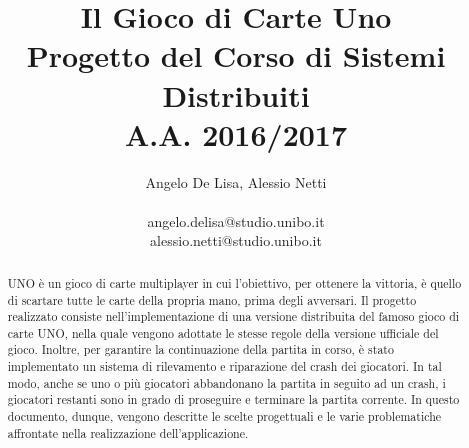 \documentclass[11pt]{article} %
\title{Il Gioco di Carte Uno\\Progetto del Corso di Sistemi Distribuiti\\A.A. 2016/2017}
\author{Angelo De Lisa, Alessio Netti \\ \\ angelo.delisa@studio.unibo.it\\ alessio.netti@studio.unibo.it}
\date{} %
\begin{document}
\maketitle
\begin{otherlanguage}{english}
\begin{abstract}
UNO è un gioco di carte multiplayer in cui l'obiettivo, per ottenere la vittoria, è quello di scartare tutte le carte della propria mano, 
prima degli avversari. Il progetto realizzato consiste nell'implementazione di una versione distribuita del famoso gioco di carte UNO, nella quale vengono 
adottate le stesse regole della versione ufficiale del gioco.
Inoltre, per garantire la continuazione della partita in corso, è stato implementato un sistema di rilevamento e riparazione del crash dei giocatori. 
In tal modo, anche se uno o più giocatori abbandonano la partita in seguito ad un crash, i giocatori restanti sono in grado di proseguire e terminare 
la partita corrente. In questo documento, dunque, vengono descritte le scelte progettuali e le varie problematiche affrontate nella realizzazione dell'applicazione.
\end{abstract}
\end{otherlanguage}

\pagebreak

\tableofcontents

\pagebreak
\end{document}
